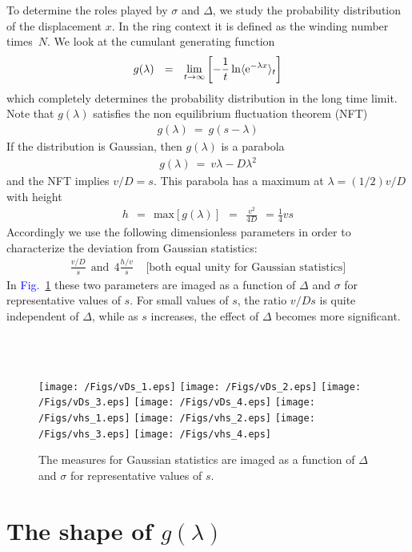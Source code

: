 \documentclass[aps,pre,floats,floatfix,fleqn,notitlepage]{revtex4-1}
\newcommand{\eexp}{\mbox{e}^}
\newcommand{\mylabel}[1]{\label{#1}}  %
\newcommand{\beq}{\begin{eqnarray}}
\newcommand{\eeq}{\end{eqnarray}}
\newcommand{\be}[1]{\begin{eqnarray}\ifthenelse{#1=-1}{\nonumber}{\ifthenelse{#1=0}{}{\mylabel{e#1}}}}
\newcommand{\ee}{\end{eqnarray}}
\newcommand{\Fig}[1] {\textcolor{blue}{Fig.~\ref{#1}}} %
\begin{document}
To determine the roles played by $\sigma$ and $\Delta$, we study 
the probability distribution of the displacement $x$.   
In the ring context it is defined as the winding number times~$N$.  
We look at the cumulant generating function
%
\be{3}
g(\lambda) \ \ = \ \ \lim_{t\to \infty} \left[-\frac{1}{t} \ln  \langle \eexp{-\lambda x} \rangle_t \right]
\ee
%
which completely determines the probability distribution in the long time limit. 
Note that $g(\lambda)$ satisfies the non equilibrium fluctuation theorem (NFT) 
%
\beq
g(\lambda) \ = \ g(s -\lambda)
\eeq
%
If the distribution is Gaussian, then $g(\lambda)$ is a parabola
%
\beq
g(\lambda) \ = \ v \lambda -D\lambda^2
\eeq
%
and the NFT implies $v/D=s$. 
This parabola has a maximum at $\lambda=(1/2)v/D$ with height 
%
\beq
h \ \ = \ \ \text{max}[g(\lambda)] \ \ = \ \ \frac{v^2}{4D} \ \ = \frac{1}{4}vs
\eeq
%
Accordingly we use the following dimensionless parameters 
in order to characterize the deviation from Gaussian statistics:
%
\beq
\frac{v/D}{s} \ \ \text{and} \ \ 4\frac{h/v}{s} \ \ \ \ \ \text{[both equal unity for Gaussian statistics]}
\eeq
%
In \Fig{fig3} these two parameters are imaged as a function of $\Delta$ and $\sigma$ 
for representative values of $s$.  For small values of $s$, the ratio $v/Ds$ 
is quite independent of $\Delta$, while as $s$ increases, the effect of $\Delta$ becomes more significant. 


\ \\ \ \\ 

\begin{figure}[h]

\texttt{[image: /Figs/vDs\_1.eps]}
\texttt{[image: /Figs/vDs\_2.eps]}
\texttt{[image: /Figs/vDs\_3.eps]}
\texttt{[image: /Figs/vDs\_4.eps]}
%
%
\texttt{[image: /Figs/vhs\_1.eps]}
\texttt{[image: /Figs/vhs\_2.eps]}
\texttt{[image: /Figs/vhs\_3.eps]}
\texttt{[image: /Figs/vhs\_4.eps]}

\caption{
The measures for Gaussian statistics are imaged as a function of $\Delta$ and $\sigma$ 
for representative values of $s$. }
\label{fig3}
\end{figure}




\newpage 
\section{The shape of $g(\lambda)$}
\end{document}
